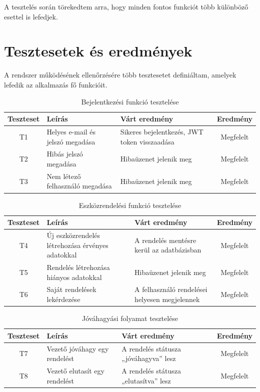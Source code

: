 \documentclass[
]{thesis-ekf}
\theoremstyle{definition}
\theoremstyle{remark}
\begin{document}
A tesztelés során törekedtem arra, hogy minden fontos funkciót több különböző esettel is lefedjek.

\section{Tesztesetek és eredmények}
A rendszer működésének ellenőrzésére több tesztesetet definiáltam, amelyek lefedik az alkalmazás fő funkcióit.

\begin{table}[H]
	\centering
	\begin{tabular}{|c|p{4cm}|p{5cm}|c|}
		\hline
		\textbf{Teszteset} & \textbf{Leírás} & \textbf{Várt eredmény} & \textbf{Eredmény} \\
		\hline
		T1 & Helyes e-mail és jelszó megadása & Sikeres bejelentkezés, JWT token visszaadása & Megfelelt \\
		\hline
		T2 & Hibás jelszó megadása & Hibaüzenet jelenik meg & Megfelelt \\
		\hline
		T3 & Nem létező felhasználó megadása & Hibaüzenet jelenik meg & Megfelelt \\
		\hline
	\end{tabular}
	\caption{Bejelentkezési funkció tesztelése}
\end{table}

\begin{table}[H]
	\centering
	\begin{tabular}{|c|p{4cm}|p{5cm}|c|}
		\hline
		\textbf{Teszteset} & \textbf{Leírás} & \textbf{Várt eredmény} & \textbf{Eredmény} \\
		\hline
		T4 & Új eszközrendelés létrehozása érvényes adatokkal & A rendelés mentésre kerül az adatbázisban & Megfelelt \\
		\hline
		T5 & Rendelés létrehozása hiányos adatokkal & Hibaüzenet jelenik meg & Megfelelt \\
		\hline
		T6 & Saját rendelések lekérdezése & A felhasználó rendelései helyesen megjelennek & Megfelelt \\
		\hline
	\end{tabular}
	\caption{Eszközrendelési funkció tesztelése}
\end{table}

\begin{table}[H]
	\centering
	\begin{tabular}{|c|p{4cm}|p{5cm}|c|}
		\hline
		\textbf{Teszteset} & \textbf{Leírás} & \textbf{Várt eredmény} & \textbf{Eredmény} \\
		\hline
		T7 & Vezető jóváhagy egy rendelést & A rendelés státusza „jóváhagyva” lesz & Megfelelt \\
		\hline
		T8 & Vezető elutasít egy rendelést & A rendelés státusza „elutasítva” lesz & Megfelelt \\
		\hline
	\end{tabular}
	\caption{Jóváhagyási folyamat tesztelése}
\end{table}
\end{document}

